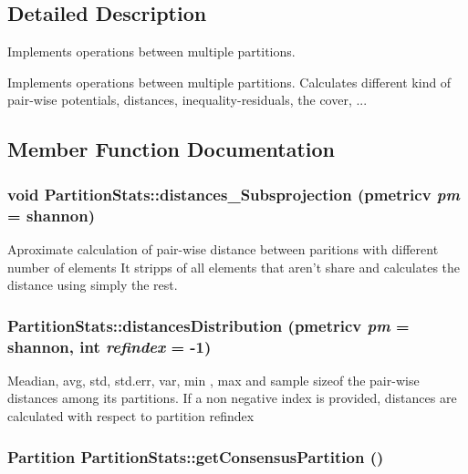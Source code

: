 \subsection{Detailed Description}
Implements operations between multiple partitions. 

Implements operations between multiple partitions. Calculates different kind of pair-wise potentials, distances, inequality-residuals, the cover, ... 



\subsection{Member Function Documentation}
\subsubsection{\setlength{\rightskip}{0pt plus 5cm}void Partition\-Stats::distances\_\-Subsprojection (pmetricv {\em pm} = shannon)}\label{classPartitionStats_a42}


Aproximate calculation of pair-wise distance between paritions with different number of elements It stripps of all elements that aren't share and calculates the distance using simply the rest. 
\subsubsection{ Partition\-Stats::distances\-Distribution (pmetricv {\em pm} = shannon, int {\em refindex} = -1)}\label{classPartitionStats_a41}


Meadian, avg, std, std.err, var, min , max and sample sizeof the pair-wise distances among its partitions. If a non negative index is provided, distances are calculated with respect to partition refindex
\subsubsection{\setlength{\rightskip}{0pt plus 5cm}Partition Partition\-Stats::get\-Consensus\-Partition ()}\label{classPartitionStats_a12}


